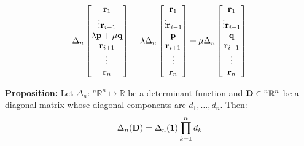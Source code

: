 \documentclass{article}
\begin{document}
\begin{minipage}[t]{0.45\linewidth}
\begin{enumerate}
            \begin{equation*}
                \Delta_n \begin{bmatrix}
                    \mathbf{r}_1 \\ \vdots \mathbf{r}_{i-1} \\ \lambda \mathbf{p}+\mu\mathbf{q} \\ \mathbf{r}_{i+1} \\ \vdots \\ \mathbf{r}_n
                \end{bmatrix} = 
                \lambda \Delta_n\begin{bmatrix}
                    \mathbf{r}_1 \\ \vdots \mathbf{r}_{i-1} \\ \mathbf{p} \\ \mathbf{r}_{i+1} \\ \vdots \\ \mathbf{r}_n
                \end{bmatrix} + \mu \Delta_n\begin{bmatrix}
                    \mathbf{r}_1 \\ \vdots \mathbf{r}_{i-1} \\ \mathbf{q} \\ \mathbf{r}_{i+1} \\ \vdots \\ \mathbf{r}_n
                \end{bmatrix}
            \end{equation*}
        \end{enumerate}
        \textbf{Proposition:} Let $\Delta_n:\, {^n}\mathbb{R}^n \mapsto \mathbb{R}$ be a determinant function and $\mathbf{D} \in {^n}\mathbb{R}^n$ be a diagonal matrix whose diagonal components are $d_1,\dots, d_n.$ Then:
        \begin{equation*}
            \Delta_n(\mathbf{D}) = \Delta_n(\mathbf{1})\prod_{k=1}^n d_k
        \end{equation*}
    \end{minipage}
    \hfill
\end{document}
